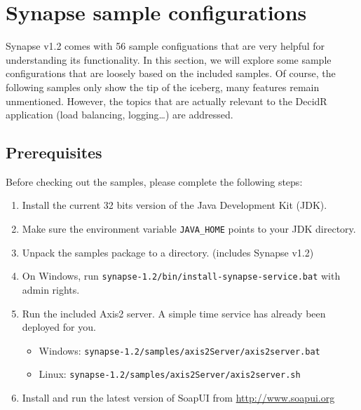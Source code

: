 
\section{Synapse sample configurations}
\label{chap:Synpase-sample-configurations}
\lstset{frame=single,
	    basicstyle=\tiny,
	    numbers=left,                   
		numberstyle=\tiny, 
	    commentstyle=\textit,
	    breaklines=true}

Synapse v1.2 comes with 56 sample configuations that are very helpful for
understanding its functionality. In this section, we will explore some sample
configurations that are loosely based on the included samples. Of course, the
following samples only show the tip of the iceberg, many features remain
unmentioned. However, the topics that are actually relevant to the DecidR
application (load balancing, logging\ldots) are addressed.

\subsection{Prerequisites}
\label{sec:prerequisites}

Before checking out the samples, please complete the following steps: 

\begin{enumerate}
\item Install the current 32 bits version of the Java Development Kit (JDK).
\item Make sure the environment variable \texttt{JAVA\_HOME} points to your JDK
directory.
\item Unpack the samples package to a directory. (includes Synapse
v1.2)
\item On Windows, run \texttt{synapse-1.2/bin/install-synapse-service.bat} with
admin rights.
\item Run the included Axis2 server. A simple time service has already
been deployed for you.
\begin{itemize}
  \item Windows: \texttt{synapse-1.2/samples/axis2Server/axis2server.bat}
  \item Linux: \texttt{synapse-1.2/samples/axis2Server/axis2server.sh}
\end{itemize}
\item Install and run the latest version of SoapUI from
\url{http://www.soapui.org}
\end{enumerate}

